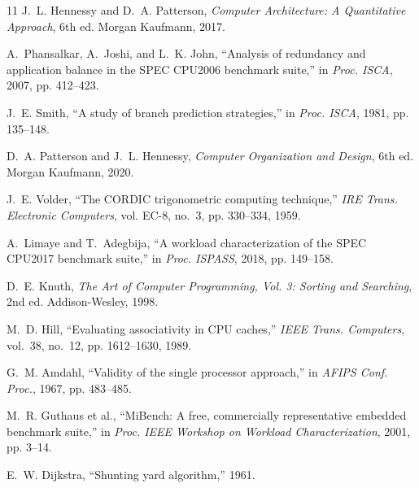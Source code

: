 \documentclass[journal]{IEEEtran}
\begin{document}
\balance
\renewcommand\refname{參考文獻}
\begin{thebibliography}{11}
 J.~L. Hennessy and D.~A. Patterson, \emph{Computer Architecture: A Quantitative Approach}, 6th ed. Morgan Kaufmann, 2017.

 A.~Phansalkar, A.~Joshi, and L.~K. John, ``Analysis of redundancy and application balance in the SPEC CPU2006 benchmark suite,'' in \emph{Proc. ISCA}, 2007, pp. 412--423.

 J.~E. Smith, ``A study of branch prediction strategies,'' in \emph{Proc. ISCA}, 1981, pp. 135--148.

 D.~A. Patterson and J.~L. Hennessy, \emph{Computer Organization and Design}, 6th ed. Morgan Kaufmann, 2020.

 J.~E. Volder, ``The CORDIC trigonometric computing technique,'' \emph{IRE Trans. Electronic Computers}, vol. EC-8, no.~3, pp. 330--334, 1959.

 A.~Limaye and T.~Adegbija, ``A workload characterization of the SPEC CPU2017 benchmark suite,'' in \emph{Proc. ISPASS}, 2018, pp. 149--158.

 D.~E. Knuth, \emph{The Art of Computer Programming, Vol. 3: Sorting and Searching}, 2nd ed. Addison-Wesley, 1998.

 M.~D. Hill, ``Evaluating associativity in CPU caches,'' \emph{IEEE Trans. Computers}, vol.~38, no.~12, pp. 1612--1630, 1989.

 G.~M. Amdahl, ``Validity of the single processor approach,'' in \emph{AFIPS Conf. Proc.}, 1967, pp. 483--485.

 M.~R. Guthaus et al., ``MiBench: A free, commercially representative embedded benchmark suite,'' in \emph{Proc. IEEE Workshop on Workload Characterization}, 2001, pp. 3--14.

 E.~W. Dijkstra, ``Shunting yard algorithm,'' 1961.
\end{thebibliography}
\end{document}
